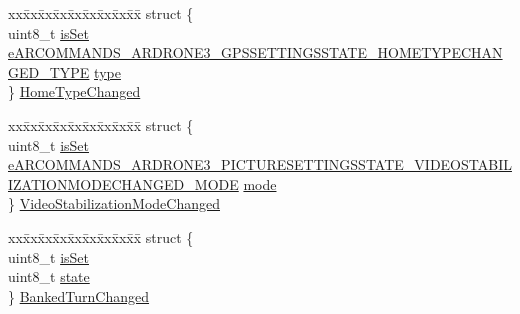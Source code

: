 \begin{DoxyCompactItemize}
\begin{tabbing}
\end{tabbing}\item 
\begin{tabbing}
xx\=xx\=xx\=xx\=xx\=xx\=xx\=xx\=xx\=\kill
struct \{\\
\>uint8\_t \hyperlink{struct_a_r_c_o_m_m_a_n_d_s___generic___drone_settings_changed__t_a247fedecf603082d26ef2b61b6a93106}{isSet}\\
\>\hyperlink{_a_r_c_o_m_m_a_n_d_s___types_8h_ad5eea5b322bc27d2e93ba44866d1c4c9}{eARCOMMANDS\_ARDRONE3\_GPSSETTINGSSTATE\_HOMETYPECHANGED\_TYPE} \hyperlink{struct_a_r_c_o_m_m_a_n_d_s___generic___drone_settings_changed__t_af5fd5f5231996600fbddedd333b714af}{type}\\
\} \hyperlink{struct_a_r_c_o_m_m_a_n_d_s___generic___drone_settings_changed__t_a24831aa6892d18827740396b86e91db2}{HomeTypeChanged}\\

\end{tabbing}\item 
\begin{tabbing}
xx\=xx\=xx\=xx\=xx\=xx\=xx\=xx\=xx\=\kill
struct \{\\
\>uint8\_t \hyperlink{struct_a_r_c_o_m_m_a_n_d_s___generic___drone_settings_changed__t_a247fedecf603082d26ef2b61b6a93106}{isSet}\\
\>\hyperlink{_a_r_c_o_m_m_a_n_d_s___types_8h_aafb5890f438f50ab71d4814e1a2e8512}{eARCOMMANDS\_ARDRONE3\_PICTURESETTINGSSTATE\_VIDEOSTABILIZATIONMODECHANGED\_MODE} \hyperlink{struct_a_r_c_o_m_m_a_n_d_s___generic___drone_settings_changed__t_a7e1d64f94046c75baf3bb87509d5886f}{mode}\\
\} \hyperlink{struct_a_r_c_o_m_m_a_n_d_s___generic___drone_settings_changed__t_a323ea0123265c7c85cd8d62880a50637}{VideoStabilizationModeChanged}\\

\end{tabbing}\item 
\begin{tabbing}
xx\=xx\=xx\=xx\=xx\=xx\=xx\=xx\=xx\=\kill
struct \{\\
\>uint8\_t \hyperlink{struct_a_r_c_o_m_m_a_n_d_s___generic___drone_settings_changed__t_a247fedecf603082d26ef2b61b6a93106}{isSet}\\
\>uint8\_t \hyperlink{struct_a_r_c_o_m_m_a_n_d_s___generic___drone_settings_changed__t_aec9fd2edfa8eece5685b39e6b6a7fe55}{state}\\
\} \hyperlink{struct_a_r_c_o_m_m_a_n_d_s___generic___drone_settings_changed__t_a4a8ee25b6689ca2eeaeb2aec9dcf6788}{BankedTurnChanged}\\

\end{tabbing}\end{DoxyCompactItemize}


